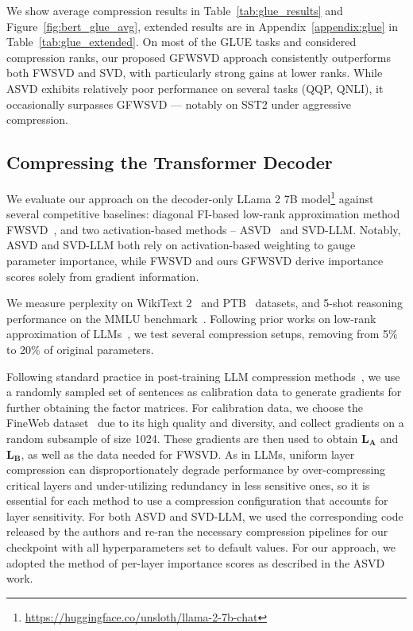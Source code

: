 \documentclass{article}
\begin{document}
We show average compression results in Table~\ref{tab:glue_results} and Figure~\ref{fig:bert_glue_avg}, extended results are in Appendix~\ref{appendix:glue} in Table~\ref{tab:glue_extended}. On most of the GLUE tasks and considered compression ranks, our proposed GFWSVD approach consistently outperforms both FWSVD and SVD, with particularly strong gains at lower ranks. While ASVD exhibits relatively poor performance on several tasks (QQP, QNLI), it occasionally surpasses GFWSVD — notably on SST2 under aggressive compression.

\subsection{Compressing the Transformer Decoder}
\label{sec:llamas}

We evaluate our approach on the decoder-only LLama 2 7B model\footnote{\url{https://huggingface.co/unsloth/llama-2-7b-chat}} against several competitive baselines: diagonal FI-based low-rank approximation method FWSVD~\cite{FWSVD}, and two activation-based methods -- ASVD~\cite{asvd} and SVD-LLM\cite{svdllm}. Notably, ASVD and SVD-LLM both rely on activation-based weighting to gauge parameter importance, while FWSVD and ours GFWSVD derive importance scores solely from gradient information. 


We measure perplexity on WikiText 2~\cite{wikitext2} and PTB~\cite{ptb} datasets, and 5-shot reasoning performance on the MMLU benchmark~\cite{mmlu}. Following prior works on low-rank approximation of LLMs~\cite{svdllm, asvd}, we test several compression setups, removing from 5\% to 20\% of original parameters. 


Following standard practice in post-training LLM compression methods~\cite{svdllm, asvd}, we use a randomly sampled set of sentences as calibration data to generate gradients for further obtaining the factor matrices. For calibration data, we choose the FineWeb dataset~\cite{DBLP:conf/nips/PenedoKALMRW024} due to its high quality and diversity, and collect gradients on a random subsample of size 1024. These gradients are then used to obtain $\mathbf{L}_\mathbf{A}$ and $\mathbf{L}_\mathbf{B}$, as well as the data needed for FWSVD. As in LLMs, uniform layer compression can disproportionately degrade performance by over-compressing critical layers and under-utilizing redundancy in less sensitive ones, so it is essential for each method to use a compression configuration that accounts for layer sensitivity. For both ASVD and SVD-LLM, we used the corresponding code released by the authors and re-ran the necessary compression pipelines for our checkpoint with all hyperparameters set to default values. For our approach, we adopted the method of per-layer importance scores as described in the ASVD work.
\end{document}
